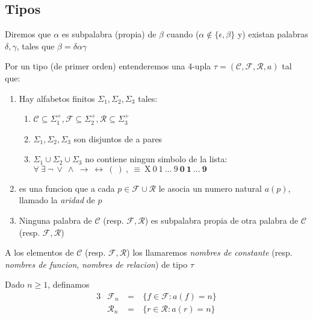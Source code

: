 \subsection{Tipos}
\begin{definition}
  Diremos que $\alpha$ es subpalabra (propia) de $\beta$ cuando ($\alpha \notin \{\epsilon, \beta \}$ y) existan palabras
  $\delta, \gamma$, tales que $\beta = \delta\alpha\gamma$ 
\end{definition}
\begin{definition}
  Por un tipo (de primer orden) entenderemos una 4-upla $\tau = (\mathcal{C}, \mathcal{F}, \mathcal{R}, a)$ tal que:
  \begin{enumerate}
    \item Hay alfabetos finitos $\Sigma_1, \Sigma_2, \Sigma_3$ tales: \begin{enumerate}
      \item $\mathcal{C} \subseteq \Sigma_1^+, \mathcal{F} \subseteq \Sigma_2^+, \mathcal{R} \subseteq \Sigma_3^+$
      \item $\Sigma_1, \Sigma_2, \Sigma_3$ son disjuntos de a pares
      \item $\Sigma_1 \cup \Sigma_2 \cup \Sigma_3$ no contiene ningun simbolo de la lista: $\forall\ \exists\ \neg\ \lor\ \land\ \rightarrow\ \leftrightarrow\ (\ )\ ,\ \equiv\ \text{X}\ \mathit{0}\ \mathit{1}\ \dots\ \mathit{9}\ \mathbf{0}\ \mathbf{1}\ \dots\ \mathbf{9}$ 
    \end{enumerate}
    \item {} es una funcion que a cada $p \in \mathcal{F} \cup \mathcal{R}$ le asocia 
    un numero natural $a(p)$, llamado la \emph{aridad} de $p$
    \item Ninguna palabra de $\mathcal{C}$ (resp. $\mathcal{F}, \mathcal{R}$) es subpalabra propia de otra palabra de $\mathcal{C}$ (resp. $\mathcal{F}, \mathcal{R}$)
  \end{enumerate}

  A los elementos de $\mathcal{C}$ (resp. $\mathcal{F}, \mathcal{R}$) los llamaremos \emph{nombres de constante} (resp. \emph{nombres de funcion}, \emph{nombres de relacion}) de tipo $\tau$

  Dado $n \geq 1$, definamos
  \begin{alignat*}{3}
    &\mathcal{F}_n &\ =&\ \{f \in \mathcal{F} : a(f) = n\}\\
    &\mathcal{R}_n &\ =&\ \{r \in \mathcal{R} : a(r) = n\}
  \end{alignat*}
\end{definition}

